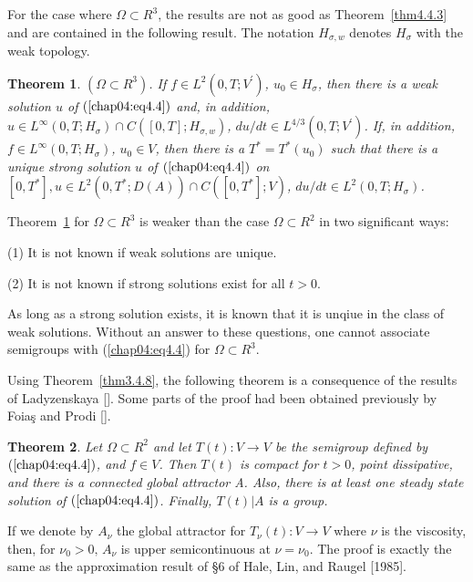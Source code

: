 \documentclass{surv-l}
\theoremstyle{plain}
\newtheorem{theorem}{Theorem}[section]
\theoremstyle{definition}
\numberwithin{equation}{section}
\numberwithin{figure}{chapter}
\begin{document}
For the case where $\Omega\subset R^{3}$, the results are not as good as Theorem~\ref{thm4.4.3} and are contained in the following result. The notation $H_{\sigma,w}$ denotes $H_{\sigma}$ with the weak topology.

\begin{theorem}\label{thm4.4.4} $(\Omega\subset R^{3})$. If $f\in L^{2}(0, T; V^{\prime})$, $u_{0}\in H_{\sigma}$, then there is a weak solution $u$ of $(\ref{chap04:eq4.4})$ and, in addition, $u\in L^{\infty}(0, T;H_{\sigma})\cap C([0, T]; H_{\sigma,w})$, $du/dt\in L^{4/3}(0, T; V^{\prime})$. If, in addition, $f\in L^{\infty}(0, T; H_{\sigma})$, $u_{0}\in V$, then there is a $T^*=T^*(u_{0})$ such that there is a unique strong solution $u$ of $(\ref{chap04:eq4.4})$ on $[0, T^{\ast}], u\in L^{2}(0, T^{\ast}; D(A))\cap C([0, T^{\ast}]; V)$, $du/dt\in L^{2}(0, T; H_{\sigma})$.
\end{theorem}

Theorem~\ref{thm4.4.4} for $\Omega\subset R^{3}$ is weaker than the case $\Omega \subset R^{2}$ in two significant ways:

(1) It is not known if weak solutions are unique.

(2) It is not known if strong solutions exist for all $t>0$.

\noindent As long as a strong solution exists, it is known that it is unqiue in the class of weak solutions. Without an answer to these questions, one cannot associate semigroups with (\ref{chap04:eq4.4}) for $\Omega\subset R^{3}$.

Using Theorem~\ref{thm3.4.8}, the following theorem is a consequence of the results of Ladyzenskaya [\citeyear{1972l}]. Some parts of the proof had been obtained previously by Foia\c{s} and Prodi [\citeyear{1967fp}].

\begin{theorem}\label{thm4.4.5} Let $\Omega\subset R^{2}$ and let $T(t): V\rightarrow V$ be the semigroup defined by $(\ref{chap04:eq4.4})$, and $f\in V$. Then $T(t)$ is compact for $t>0$, point dissipative, and there is a connected global attractor A. Also, there is at least one steady state solution of $(\ref{chap04:eq4.4})$. Finally, $T(t)|A$ is a group.
\end{theorem}

If we denote by $A_{\nu}$ the global attractor for $T_{\nu}(t): V\rightarrow V$ where $\nu$ is the viscosity, then, for $\nu_{0}>0,\, A_{\nu}$ is upper semicontinuous at $\nu =\nu_{0}$. The proof is exactly the same as the approximation result of \S 6 of Hale, Lin, and Raugel [1985].
\end{document}
